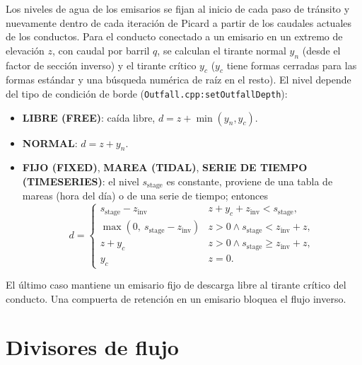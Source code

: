\documentclass[11pt,a4paper]{article}
\begin{document}
Los niveles de agua de los emisarios se fijan al inicio de cada paso de
tránsito y nuevamente dentro de cada iteración de Picard a partir de los
caudales actuales de los conductos. Para el conducto conectado a un emisario en
un extremo de elevación $z$, con caudal por barril $q$, se calculan el tirante
normal $y_n$ (desde el factor de sección inverso) y el tirante crítico $y_c$
($y_c$ tiene formas cerradas para las formas estándar y una búsqueda numérica
de raíz en el resto). El nivel depende del tipo de condición de borde
(\texttt{Outfall.cpp:setOutfallDepth}):
\begin{itemize}[nosep]
  \item \textbf{LIBRE (FREE)}: caída libre, $d = z + \min(y_n, y_c)$.
  \item \textbf{NORMAL}: $d = z + y_n$.
  \item \textbf{FIJO (FIXED)}, \textbf{MAREA (TIDAL)}, \textbf{SERIE DE TIEMPO
        (TIMESERIES)}: el nivel $s_{\mathrm{stage}}$ es constante, proviene de
        una tabla de mareas (hora del día) o de una serie de tiempo; entonces
        \begin{equation}
          d = \begin{cases}
            s_{\mathrm{stage}} - z_{\mathrm{inv}} & z + y_c + z_{\mathrm{inv}}
              < s_{\mathrm{stage}},\\
            \max(0,\ s_{\mathrm{stage}} - z_{\mathrm{inv}}) & z > 0 \wedge
              s_{\mathrm{stage}} < z_{\mathrm{inv}} + z,\\
            z + y_c & z > 0 \wedge s_{\mathrm{stage}} \ge z_{\mathrm{inv}} + z,\\
            y_c & z = 0.
          \end{cases}
        \end{equation}
\end{itemize}
El último caso mantiene un emisario fijo de descarga libre al tirante crítico
del conducto. Una compuerta de retención en un emisario bloquea el flujo
inverso.

\section{Divisores de flujo}
\end{document}
